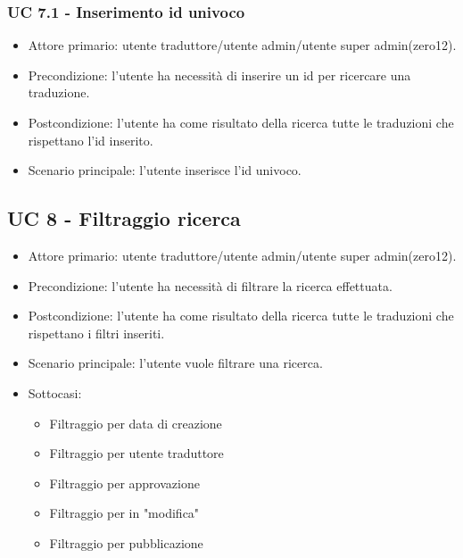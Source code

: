     \subsubsection{UC 7.1 - Inserimento id univoco}
        \begin{itemize}
            \item Attore primario: utente traduttore/utente admin/utente super admin(zero12).
            \item Precondizione: l'utente ha necessità di inserire un id per ricercare una traduzione.
            \item Postcondizione: l'utente ha come risultato della ricerca tutte le traduzioni che rispettano l'id inserito.
            \item Scenario principale: l'utente inserisce l'id univoco.
        \end{itemize}
\subsection{UC 8 - Filtraggio ricerca}
    \begin{itemize}
        \item Attore primario: utente traduttore/utente admin/utente super admin(zero12).
        \item Precondizione: l'utente ha necessità di filtrare la ricerca effettuata.
        \item Postcondizione: l'utente ha come risultato della ricerca tutte le traduzioni che rispettano i filtri inseriti.
        \item Scenario principale: l'utente vuole filtrare una ricerca.
        \item Sottocasi:
            \begin{itemize}
                \item Filtraggio per data di creazione
                \item Filtraggio per utente traduttore
                \item Filtraggio per approvazione
                \item Filtraggio per in "modifica"
                \item Filtraggio per pubblicazione
            \end{itemize}
    \end{itemize}  
